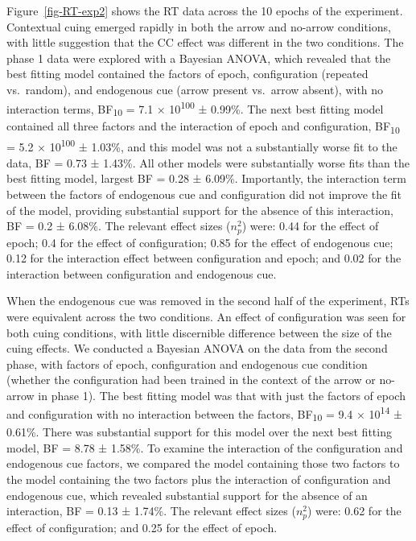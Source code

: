 \documentclass[
  man,
  floatsintext,
  longtable,
  nolmodern,
  notxfonts,
  notimes,
  colorlinks=true,linkcolor=blue,citecolor=blue,urlcolor=blue]{apa7}
\begin{document}
Figure~\ref{fig-RT-exp2} shows the RT data across the 10 epochs of the
experiment. Contextual cuing emerged rapidly in both the arrow and
no-arrow conditions, with little suggestion that the CC effect was
different in the two conditions. The phase 1 data were explored with a
Bayesian ANOVA, which revealed that the best fitting model contained the
factors of epoch, configuration (repeated vs.~random), and endogenous
cue (arrow present vs.~arrow absent), with no interaction terms,
BF\textsubscript{10} = 7.1 × 10\textsuperscript{100} ± 0.99\%. The next
best fitting model contained all three factors and the interaction of
epoch and configuration, BF\textsubscript{10} = 5.2 ×
10\textsuperscript{100} ± 1.03\%, and this model was not a substantially
worse fit to the data, BF = 0.73 ± 1.43\%. All other models were
substantially worse fits than the best fitting model, largest BF = 0.28
± 6.09\%. Importantly, the interaction term between the factors of
endogenous cue and configuration did not improve the fit of the model,
providing substantial support for the absence of this interaction, BF =
0.2 ± 6.08\%. The relevant effect sizes (\(n^2_p\)) were: 0.44 for the
effect of epoch; 0.4 for the effect of configuration; 0.85 for the
effect of endogenous cue; 0.12 for the interaction effect between
configuration and epoch; and 0.02 for the interaction between
configuration and endogenous cue.

When the endogenous cue was removed in the second half of the
experiment, RTs were equivalent across the two conditions. An effect of
configuration was seen for both cuing conditions, with little
discernible difference between the size of the cuing effects. We
conducted a Bayesian ANOVA on the data from the second phase, with
factors of epoch, configuration and endogenous cue condition (whether
the configuration had been trained in the context of the arrow or
no-arrow in phase 1). The best fitting model was that with just the
factors of epoch and configuration with no interaction between the
factors, BF\textsubscript{10} = 9.4 × 10\textsuperscript{14} ± 0.61\%.
There was substantial support for this model over the next best fitting
model, BF = 8.78 ± 1.58\%. To examine the interaction of the
configuration and endogenous cue factors, we compared the model
containing those two factors to the model containing the two factors
plus the interaction of configuration and endogenous cue, which revealed
substantial support for the absence of an interaction, BF = 0.13 ±
1.74\%. The relevant effect sizes (\(n^2_p\)) were: 0.62 for the effect
of configuration; and 0.25 for the effect of epoch.
\end{document}
